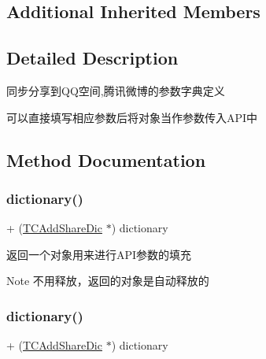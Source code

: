 \subsection*{Additional Inherited Members}


\subsection{Detailed Description}
同步分享到\+Q\+Q空间,腾讯微博的参数字典定义 

可以直接填写相应参数后将对象当作参数传入\+A\+P\+I中 

\subsection{Method Documentation}
\mbox{\label{interface_t_c_add_share_dic_a42a05258af41808f8cfe4a987e73b3d3}} 
\subsubsection{\texorpdfstring{dictionary()}{dictionary()}\hspace{0.1cm}{\footnotesize\ttfamily [1/2]}}
{\footnotesize\ttfamily + (\mbox{\hyperlink{interface_t_c_add_share_dic}{T\+C\+Add\+Share\+Dic}} $\ast$) dictionary \begin{DoxyParamCaption}{ }\end{DoxyParamCaption}}

返回一个对象用来进行\+A\+P\+I参数的填充

\begin{DoxyNote}{Note}
不用释放，返回的对象是自动释放的 
\end{DoxyNote}
\mbox{\label{interface_t_c_add_share_dic_a42a05258af41808f8cfe4a987e73b3d3}} 
\subsubsection{\texorpdfstring{dictionary()}{dictionary()}\hspace{0.1cm}{\footnotesize\ttfamily [2/2]}}
{\footnotesize\ttfamily + (\mbox{\hyperlink{interface_t_c_add_share_dic}{T\+C\+Add\+Share\+Dic}} $\ast$) dictionary \begin{DoxyParamCaption}{ }\end{DoxyParamCaption}}

